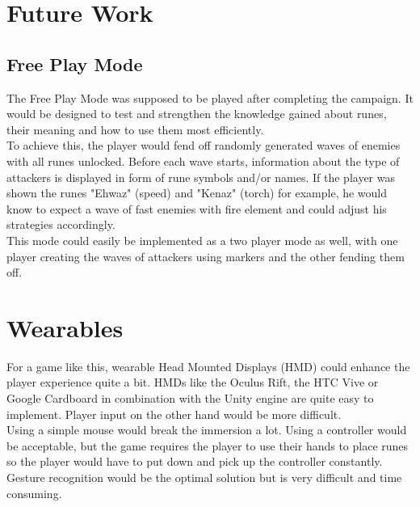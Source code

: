 \section{Future Work}

\subsection{Free Play Mode}

The Free Play Mode was supposed to be played after completing the campaign. It would be designed to test and strengthen the knowledge gained about runes, their meaning and how to use them most efficiently.\\
To achieve this, the player would fend off randomly generated waves of enemies with all runes unlocked. Before each wave starts, information about the type of attackers is displayed in form of rune symbols and/or names. If the player was shown the runes "Ehwaz" (speed) and "Kenaz" (torch) for example, he would know to expect a wave of fast enemies with fire element and could adjust his strategies accordingly.\\
This mode could easily be implemented as a two player mode as well, with one player creating the waves of attackers using markers and the other fending them off.

\section{Wearables}

For a game like this, wearable Head Mounted Displays (HMD) could enhance the player experience quite a bit. HMDs like the Oculus Rift, the HTC Vive or Google Cardboard in combination with the Unity engine are quite easy to implement. Player input on the other hand would be more difficult. \\ 
Using a simple mouse would break the immersion a lot. Using a controller would be acceptable, but the game requires the player to use their hands to place runes so the player would have to put down and pick up the controller constantly. Gesture recognition would be the optimal solution but is very difficult and time consuming. 